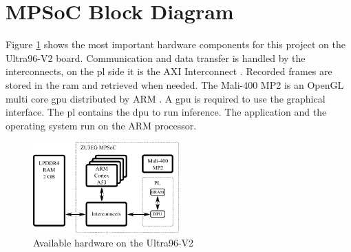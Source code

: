 \section{MPSoC Block Diagram}
\label{sec:embedded_platform:block_diagram}

Figure \ref{fig:hardware_overview} shows the most important hardware components for this project on the Ultra96-V2 board.
Communication and data transfer is handled by the interconnects, on the \acrlong{pl} side it is the AXI Interconnect \cite{mpsoc_memory}.
Recorded frames are stored in the \acrshort{ram} and retrieved when needed.
The Mali-400 MP2 is an OpenGL multi core \acrfull{gpu} distributed by ARM \cite{arm_mali}.
A \acrshort{gpu} is required to use the graphical interface.
The \acrshort{pl} contains the \acrshort{dpu} to run inference.
The application and the operating system run on the ARM processor.

\begin{figure}
  \centering
  \includegraphics[width=0.5\textwidth]{graphics/hardware_overview.pdf}
  \caption{Available hardware on the Ultra96-V2}
  \label{fig:hardware_overview}
\end{figure}
